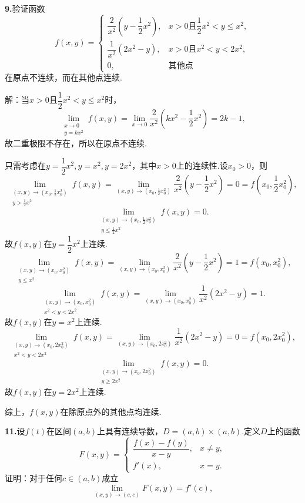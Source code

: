 \documentclass[12pt, a4paper]{article}
\begin{document}
\textbf{9.}验证函数
\[f(x, y) = \begin{cases}
\dfrac{2}{x^2}\left(y - \dfrac{1}{2}x^2\right), & x > 0\text{且}\dfrac{1}{2}x^2 < y \leq x^2, \\
\dfrac{1}{x^2}(2x^2 - y), & x > 0\text{且}x^2 < y < 2x^2, \\
0, & \text{其他点}
\end{cases}\]
在原点不连续，而在其他点连续.

解：当\(x > 0\)且\(\dfrac{1}{2}x^2 < y \leq x^2\)时，
\[\lim_{\substack{x \to 0 \\ y = kx^2}} f(x, y) = \lim_{x \to 0} \dfrac{2}{x^2}\left(kx^2 - \dfrac{1}{2}x^2\right) = 2k - 1,\]
故二重极限不存在，所以在原点不连续.

只需考虑在\(y = \dfrac{1}{2}x^2, y = x^2, y = 2x^2\)，其中\(x > 0\)上的连续性.设\(x_0 > 0\)，则
\[\lim_{\substack{(x, y) \to (x_0, \frac{1}{2}x_0^2) \\ y > \frac{1}{2}x^2}} f(x, y) = \lim_{(x, y) \to (x_0, \frac{1}{2}x_0^2)} \dfrac{2}{x^2}\left(y - \dfrac{1}{2}x^2\right) = 0 = f(x_0, \dfrac{1}{2}x_0^2),\]
\[\lim_{\substack{(x, y) \to (x_0, \frac{1}{2}x_0^2) \\ y \leq \frac{1}{2}x^2}} f(x, y) = 0.\]
故\(f(x, y)\)在\(y = \dfrac{1}{2}x^2\)上连续.
\[\lim_{\substack{(x, y) \to (x_0, x_0^2) \\ y \leq x^2}} f(x, y) = \lim_{(x, y) \to (x_0, x_0^2)} \dfrac{2}{x^2}\left(y - \dfrac{1}{2}x^2\right) = 1 = f(x_0, x_0^2),\]
\[\lim_{\substack{(x, y) \to (x_0, x_0^2) \\ x^2 < y < 2x^2}} f(x, y) = \lim_{(x, y) \to (x_0, x_0^2)} \dfrac{1}{x^2}(2x^2 - y) = 1.\]
故\(f(x, y)\)在\(y = x^2\)上连续.
\[\lim_{\substack{(x, y) \to (x_0, 2x_0^2) \\ x^2 < y < 2x^2}} f(x, y) = \lim_{(x, y) \to (x_0, 2x_0^2)} \dfrac{1}{x^2}(2x^2 - y) = 0 = f(x_0, 2x_0^2),\]
\[\lim_{\substack{(x, y) \to (x_0, 2x_0^2) \\ y \geq 2x^2}} f(x, y) = 0.\]
故\(f(x, y)\)在\(y = 2x^2\)上连续.

综上，\(f(x, y)\)在除原点外的其他点均连续.

\textbf{11.}设\(f(t)\)在区间\((a, b)\)上具有连续导数，\(D = (a, b) \times (a, b)\).定义\(D\)上的函数
\[F(x, y) = \begin{cases}
\dfrac{f(x) - f(y)}{x - y}, & x \neq y, \\
f'(x), & x = y.
\end{cases}\]
证明：对于任何\(c \in (a, b)\)成立
\[\lim_{(x, y) \to (c, c)} F(x, y) = f'(c),\]
\end{document}
